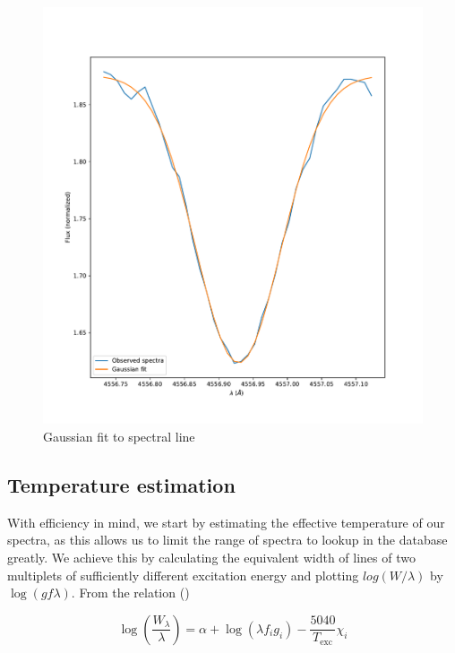 \documentclass{aa}
\begin{document}
\begin{figure}
  \centering
  \includegraphics[width=\linewidth]{line_fit1.pdf}
  \caption{Gaussian fit to spectral line}
  \label{fig:line_fit}
\end{figure}

\subsection{Temperature estimation}

With efficiency in mind, we start by estimating the effective temperature of our
spectra, as this allows us to limit the range of spectra to lookup in the
database greatly. We achieve this by calculating the equivalent width of lines
of two multiplets of sufficiently different excitation energy and plotting
$log \left(  W / \lambda \right)$ by $\log \left( g f \lambda \right)$. From the
relation (\cite{monteiro_sebenta_2019}) 

\begin{equation}
  \label{eq:log_W_relation}
  \log \left( \frac{W_\lambda}{\lambda} \right) = \alpha  + \log \left( \lambda f_i g_i \right) - \frac{5040}{T_{\text{exc}}} \chi_i
\end{equation}
\end{document}

